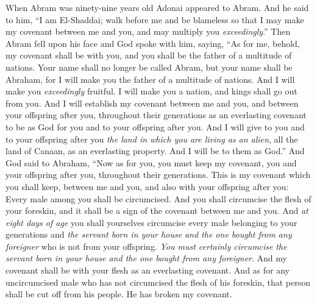 \begin{biblechapter} %
 When Abram was ninety-nine years old Adonai appeared to Abram. And he said to him, “I am El-Shaddai; walk before me and be blameless
\verse so that I may make my covenant between me and you, and may multiply you \textit{exceedingly}.”
\verse Then Abram fell upon his face and God spoke with him, saying,
\verse “As for me, behold, my covenant shall be with you, and you shall be the father of a multitude of nations.
\verse Your name shall no longer be called Abram, but your name shall be Abraham, for I will make you the father of a multitude of nations.
\verse And I will make you \textit{exceedingly} fruitful. I will make you a nation, and kings shall go out from you.
\verse And I will establish my covenant between me and you, and between your offspring after you, throughout their generations as an everlasting covenant to be as God for you and to your offspring after you.
\verse And I will give to you and to your offspring after you \textit{the land in which you are living as an alien}, all the land of Canaan, as an everlasting property. And I will be to them as God.”
\verse And God said to Abraham, “Now as for you, you must keep my covenant, you and your offspring after you, throughout their generations.
\verse This is my covenant which you shall keep, between me and you, and also with your offspring after you: Every male among you shall be circumcised.
\verse And you shall circumcise the flesh of your foreskin, and it shall be a sign of the covenant between me and you.
\verse And \textit{at eight days of age} you shall yourselves circumcise every male belonging to your generations and \textit{the servant born in your house and the one bought from any foreigner} who is not from your offspring.
\verse \textit{You must certainly circumcise} \textit{the servant born in your house and the one bought from any foreigner}. And my covenant shall be with your flesh as an everlasting covenant.
\verse And as for any uncircumcised male who has not circumcised the flesh of his foreskin, that person shall be cut off from his people. He has broken my covenant.

\end{biblechapter}
